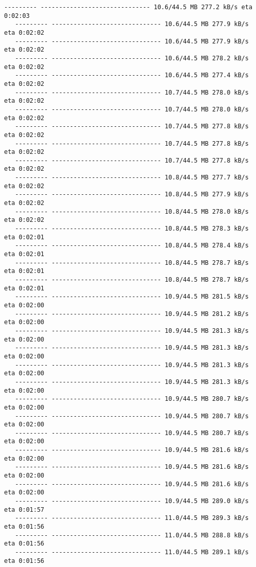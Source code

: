 \documentclass[11pt]{article}
\begin{document}
\begin{Verbatim}[commandchars=\\\{\}]
   --------- ------------------------------ 10.6/44.5 MB 277.2 kB/s eta 0:02:03
   --------- ------------------------------ 10.6/44.5 MB 277.9 kB/s eta 0:02:02
   --------- ------------------------------ 10.6/44.5 MB 277.9 kB/s eta 0:02:02
   --------- ------------------------------ 10.6/44.5 MB 278.2 kB/s eta 0:02:02
   --------- ------------------------------ 10.6/44.5 MB 277.4 kB/s eta 0:02:02
   --------- ------------------------------ 10.7/44.5 MB 278.0 kB/s eta 0:02:02
   --------- ------------------------------ 10.7/44.5 MB 278.0 kB/s eta 0:02:02
   --------- ------------------------------ 10.7/44.5 MB 277.8 kB/s eta 0:02:02
   --------- ------------------------------ 10.7/44.5 MB 277.8 kB/s eta 0:02:02
   --------- ------------------------------ 10.7/44.5 MB 277.8 kB/s eta 0:02:02
   --------- ------------------------------ 10.8/44.5 MB 277.7 kB/s eta 0:02:02
   --------- ------------------------------ 10.8/44.5 MB 277.9 kB/s eta 0:02:02
   --------- ------------------------------ 10.8/44.5 MB 278.0 kB/s eta 0:02:02
   --------- ------------------------------ 10.8/44.5 MB 278.3 kB/s eta 0:02:01
   --------- ------------------------------ 10.8/44.5 MB 278.4 kB/s eta 0:02:01
   --------- ------------------------------ 10.8/44.5 MB 278.7 kB/s eta 0:02:01
   --------- ------------------------------ 10.8/44.5 MB 278.7 kB/s eta 0:02:01
   --------- ------------------------------ 10.9/44.5 MB 281.5 kB/s eta 0:02:00
   --------- ------------------------------ 10.9/44.5 MB 281.2 kB/s eta 0:02:00
   --------- ------------------------------ 10.9/44.5 MB 281.3 kB/s eta 0:02:00
   --------- ------------------------------ 10.9/44.5 MB 281.3 kB/s eta 0:02:00
   --------- ------------------------------ 10.9/44.5 MB 281.3 kB/s eta 0:02:00
   --------- ------------------------------ 10.9/44.5 MB 281.3 kB/s eta 0:02:00
   --------- ------------------------------ 10.9/44.5 MB 280.7 kB/s eta 0:02:00
   --------- ------------------------------ 10.9/44.5 MB 280.7 kB/s eta 0:02:00
   --------- ------------------------------ 10.9/44.5 MB 280.7 kB/s eta 0:02:00
   --------- ------------------------------ 10.9/44.5 MB 281.6 kB/s eta 0:02:00
   --------- ------------------------------ 10.9/44.5 MB 281.6 kB/s eta 0:02:00
   --------- ------------------------------ 10.9/44.5 MB 281.6 kB/s eta 0:02:00
   --------- ------------------------------ 10.9/44.5 MB 289.0 kB/s eta 0:01:57
   --------- ------------------------------ 11.0/44.5 MB 289.3 kB/s eta 0:01:56
   --------- ------------------------------ 11.0/44.5 MB 288.8 kB/s eta 0:01:56
   --------- ------------------------------ 11.0/44.5 MB 289.1 kB/s eta 0:01:56

\end{Verbatim}
\end{document}
